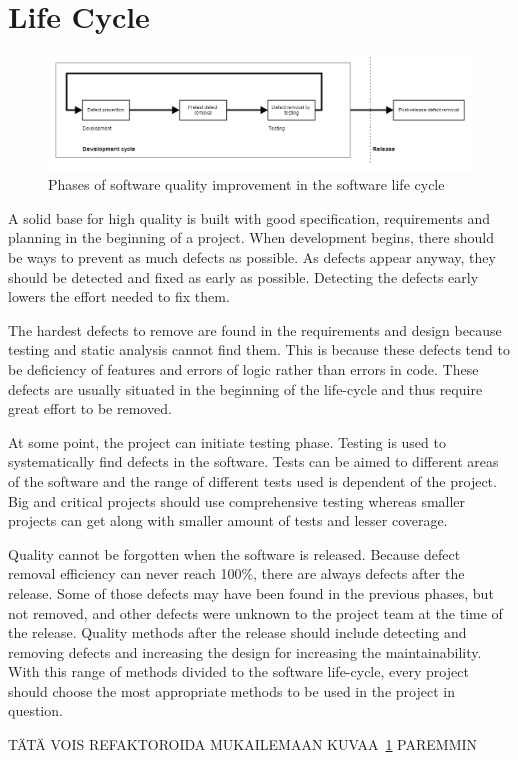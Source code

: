 \section{Life Cycle}

\begin{figure}[t]
\begin{center}
\includegraphics[width=1.0\textwidth]{image/quality_lifecycle.png}
\end{center}
\caption{Phases of software quality improvement in the software life cycle}
\label{fig:quality_life_cycle}
\end{figure}

A solid base for high quality is built with good specification, requirements and planning in the beginning of a project. When development begins, there should be ways to prevent as much defects as possible. As defects appear anyway, they should be detected and fixed as early as possible. Detecting the defects early lowers the effort needed to fix them. 

The hardest defects to remove are found in the requirements and design because testing and static analysis cannot find them. This is because these defects tend to be deficiency of features and errors of logic rather than errors in code. These defects are usually situated in the beginning of the life-cycle and thus require great effort to be removed. 

At some point, the project can initiate testing phase. Testing is used to systematically find defects in the software. Tests can be aimed to different areas of the software and the range of different tests used is dependent of the project. Big and critical projects should use comprehensive testing whereas smaller projects can get along with smaller amount of tests and lesser coverage.

Quality cannot be forgotten when the software is released. Because defect removal efficiency can never reach 100\%, there are always defects after the release. Some of those defects may have been found in the previous phases, but not removed, and other defects were unknown to the project team at the time of the release. Quality methods after the release should include detecting and removing defects and increasing the design for increasing the maintainability. With this range of methods divided to the software life-cycle, every project should choose the most appropriate methods to be used in the project in question.


TÄTÄ VOIS REFAKTOROIDA MUKAILEMAAN KUVAA~\ref{fig:quality_life_cycle} PAREMMIN

